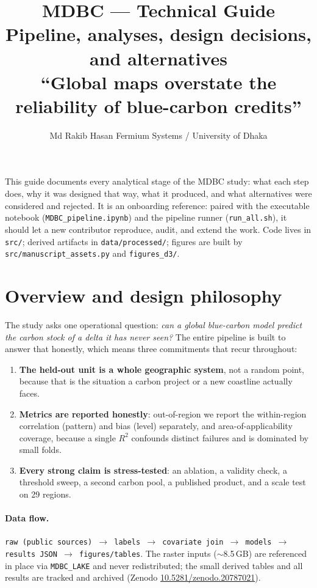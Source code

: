 \documentclass[11pt]{article}
\title{\vspace{-1.5cm}\textbf{MDBC --- Technical Guide}\\[2pt]
\large Pipeline, analyses, design decisions, and alternatives\\[6pt]
\normalsize ``Global maps overstate the reliability of blue-carbon credits''}
\author{Md Rakib Hasan\,\textemdash\,Fermium Systems / University of Dhaka}
\date{}
\newcommand{\file}[1]{\texttt{\small #1}}
\begin{document}
\maketitle
\vspace{-0.8cm}

\noindent This guide documents every analytical stage of the MDBC study: what each step
does, why it was designed that way, what it produced, and what alternatives were considered
and rejected. It is an onboarding reference: paired with the executable notebook
(\file{MDBC\_pipeline.ipynb}) and the pipeline runner (\file{run\_all.sh}), it should let a
new contributor reproduce, audit, and extend the work. Code lives in \file{src/}; derived
artifacts in \file{data/processed/}; figures are built by \file{src/manuscript\_assets.py}
and \file{figures\_d3/}.

\tableofcontents
\bigskip

\section{Overview and design philosophy}
The study asks one operational question: \emph{can a global blue-carbon model predict the
carbon stock of a delta it has never seen?} The entire pipeline is built to answer that
honestly, which means three commitments that recur throughout:
\begin{enumerate}
  \item \textbf{The held-out unit is a whole geographic system}, not a random point, because
  that is the situation a carbon project or a new coastline actually faces.
  \item \textbf{Metrics are reported honestly}: out-of-region we report the within-region
  correlation (pattern) and bias (level) separately, and area-of-applicability coverage,
  because a single $R^2$ confounds distinct failures and is dominated by small folds.
  \item \textbf{Every strong claim is stress-tested}: an ablation, a validity check, a
  threshold sweep, a second carbon pool, a published product, and a scale test on 29 regions.
\end{enumerate}

\paragraph{Data flow.} \file{raw (public sources) $\to$ labels $\to$ covariate join $\to$
models $\to$ results JSON $\to$ figures/tables}. The raster inputs ($\sim$8.5\,GB) are
referenced in place via \file{MDBC\_LAKE} and never redistributed; the small derived tables
and all results are tracked and archived (Zenodo \href{https://doi.org/10.5281/zenodo.20787021}{10.5281/zenodo.20787021}).
\end{document}
